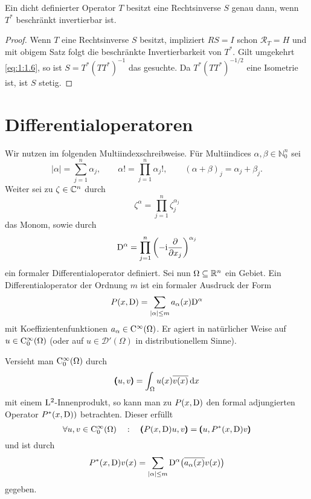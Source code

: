 \begin{cor}\label{cor:1:1.3}
Ein dicht definierter Operator $T$ besitzt eine Rechtsinverse $S$ genau dann, wenn $T^*$ beschränkt invertierbar ist.
\end{cor}
\begin{proof}
Wenn $T$ eine Rechtsinverse $S$ besitzt, impliziert $RS=I$ schon $\mathcal R_T=H$ und mit obigem Satz folgt die beschränkte Invertierbarkeit von $T^*$. Gilt umgekehrt \eqref{eq:1:1.6}, so ist $S=T^*(TT^*)^{-1}$ das gesuchte. Da $T^*(TT^*)^{-1/2}$ eine Isometrie ist, ist $S$ stetig.
\end{proof}

\section{Differentialoperatoren} 
Wir nutzen im folgenden Multiindexschreibweise. Für Multiindices $\alpha,\beta\in\mathbb N_0^n$ sei
\begin{equation}
|\alpha|=\sum_{j=1}^n \alpha_j,\qquad \alpha! = \prod_{j=1}^n \alpha_j!,\qquad (\alpha+\beta)_j=\alpha_j+\beta_j.
\end{equation} 
Weiter sei zu $\zeta\in\mathbb C^n$ durch
\begin{equation}
   \zeta^\alpha = \prod_{j=1}^n \zeta_j^{\alpha_j}
\end{equation}
das Monom, sowie durch
\begin{equation}
   \mathrm D^\alpha = \prod_{j=1}^n \left(- \mathrm i \frac{\partial}{\partial x_j}\right)^{\alpha_j}
\end{equation}
ein formaler Differentialoperator definiert. Sei nun $\Omega\subseteq\mathbb R^n$ ein Gebiet. Ein Differentialoperator der Ordnung $m$ ist ein formaler Ausdruck der Form
\begin{equation}
    P(x,\mathrm D) = \sum_{|\alpha|\le m} a_\alpha(x) \mathrm D^\alpha
\end{equation}
mit Koeffizientenfunktionen $a_\alpha\in \mathrm C^\infty(\Omega)$. Er agiert in nat\"urlicher Weise auf $u\in\mathrm C^\infty_0(\Omega)$ (oder auf $u\in\mathscr D'(\Omega)$ in distributionellem Sinne).

Versieht man $\mathrm C_0^\infty(\Omega)$ durch
\begin{equation}
    \pmb(u,v\pmb) = \int_{\Omega} u(x) \overline{v(x)} \,\mathrm d x
\end{equation}
mit einem $\mathrm L^2$-Innenprodukt, so kann man zu $P(x,\mathrm D)$ den formal adjungierten Operator $P^*(x,\mathrm D))$ betrachten. Dieser erf\"ullt
\begin{equation}
   \forall u,v\in\mathrm C_0^\infty(\Omega)\quad:\quad \pmb( P(x,\mathrm D)u,v\pmb)=\pmb(u,  P^*(x,\mathrm D)v\pmb)
\end{equation}
und ist durch
\begin{equation}
    P^*(x,\mathrm D) v(x) = \sum_{|\alpha|\le m}  \mathrm D^\alpha\big(\overline{a_\alpha(x)}v(x)\big)
\end{equation}
gegeben.

